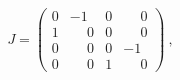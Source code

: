 \begin{equation*}
  J = 
  \begin{pmatrix}
    0 & -1 & 0 & \phantom{-}0\\
    1 & \phantom{-}0 & 0 & \phantom{-}0\\
    0 & \phantom{-}0 & 0 & -1\\
    0 & \phantom{-}0 & 1 & \phantom{-}0
  \end{pmatrix}~,
\end{equation*}

